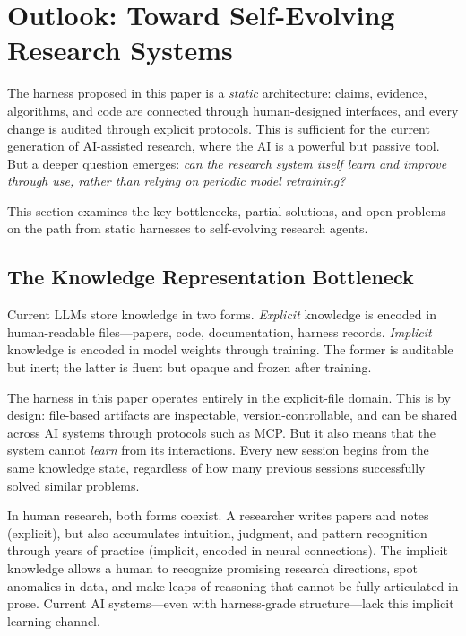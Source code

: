 \documentclass{article}
\begin{document}
\section{Outlook: Toward Self-Evolving Research Systems}
\label{sec:outlook}

The harness proposed in this paper is a \emph{static} architecture: claims, evidence, algorithms, and code are connected through human-designed interfaces, and every change is audited through explicit protocols. This is sufficient for the current generation of AI-assisted research, where the AI is a powerful but passive tool. But a deeper question emerges: \emph{can the research system itself learn and improve through use, rather than relying on periodic model retraining?}

This section examines the key bottlenecks, partial solutions, and open problems on the path from static harnesses to self-evolving research agents.

\subsection{The Knowledge Representation Bottleneck}

Current LLMs store knowledge in two forms. \emph{Explicit} knowledge is encoded in human-readable files---papers, code, documentation, harness records. \emph{Implicit} knowledge is encoded in model weights through training. The former is auditable but inert; the latter is fluent but opaque and frozen after training.

The harness in this paper operates entirely in the explicit-file domain. This is by design: file-based artifacts are inspectable, version-controllable, and can be shared across AI systems through protocols such as MCP. But it also means that the system cannot \emph{learn} from its interactions. Every new session begins from the same knowledge state, regardless of how many previous sessions successfully solved similar problems.

In human research, both forms coexist. A researcher writes papers and notes (explicit), but also accumulates intuition, judgment, and pattern recognition through years of practice (implicit, encoded in neural connections). The implicit knowledge allows a human to recognize promising research directions, spot anomalies in data, and make leaps of reasoning that cannot be fully articulated in prose. Current AI systems---even with harness-grade structure---lack this implicit learning channel.
\end{document}
